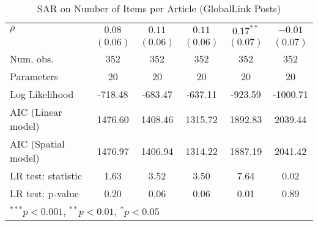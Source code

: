 \begin{table}[!h]
\begin{center}
\begin{tabular}{l c c c c c }
$\rho$                  & $0.08$       & $0.11$       & $0.11$       & $0.17^{**}$  & $-0.01$      \\
                        & $(0.06)$     & $(0.06)$     & $(0.06)$     & $(0.07)$     & $(0.07)$     \\
\midrule
Num. obs.               & 352          & 352          & 352          & 352          & 352          \\
Parameters              & 20           & 20           & 20           & 20           & 20           \\
Log Likelihood          & -718.48      & -683.47      & -637.11      & -923.59      & -1000.71     \\
AIC (Linear model)      & 1476.60      & 1408.46      & 1315.72      & 1892.83      & 2039.44      \\
AIC (Spatial model)     & 1476.97      & 1406.94      & 1314.22      & 1887.19      & 2041.42      \\
LR test: statistic      & 1.63         & 3.52         & 3.50         & 7.64         & 0.02         \\
LR test: p-value        & 0.20         & 0.06         & 0.06         & 0.01         & 0.89         \\
\bottomrule
\multicolumn{6}{l}{\scriptsize{$^{***}p<0.001$, $^{**}p<0.01$, $^*p<0.05$}}
\end{tabular}
\caption{SAR on Number of Items per Article (GlobalLink Posts)}
\label{table:coefficients}
\end{center}
\end{table}
